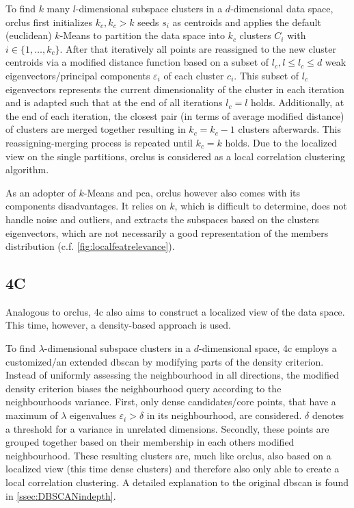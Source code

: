 To find $k$ many $l$-dimensional subspace clusters in a $d$-dimensional data space, \gls{orclus} first initializes $k_c, k_c > k$ seeds $s_i$ as centroids and applies the default (euclidean) $k$-Means to partition the data space into $k_c$ clusters $C_i$ with $i \in \{1,\dotsc,k_c\}$. After that iteratively all points are reassigned to the new cluster centroids via a modified distance function based on a subset of $l_c, l\leq l_c \leq d$ weak eigenvectors/principal components $\varepsilon_i$ of each cluster $c_i$. This subset of $l_c$ eigenvectors represents the current dimensionality of the cluster in each iteration and is adapted such that at the end of all iterations $l_c=l$ holds. Additionally, at the end of each iteration, the closest pair (in terms of average modified distance) of clusters are merged together resulting in $k_c = k_c-1$ clusters afterwards. This reassigning-merging process is repeated until $k_c = k$ holds. Due to the localized view on the single partitions, \gls{orclus} is considered as a local correlation clustering algorithm\cite{orclusaggarwal2000finding}.

As an adopter of $k$-Means and \gls{pca}, \gls{orclus} however also comes with its components disadvantages. It relies on $k$, which is difficult to determine, does not handle noise and outliers, and extracts the subspaces based on the clusters eigenvectors, which are not necessarily a good representation of the members distribution (c.f. \autoref{fig:localfeatrelevance}).


\subsection{4C}\label{ssec:4c}
Analogous to \gls{orclus}, \gls{4c} also aims to construct a localized view of the data space. This time, however, a density-based approach is used. 

To find $\lambda$-dimensional subspace clusters in a $d$-dimensional space, \gls{4c} employs a customized/an extended \acrshort{dbscan} by modifying parts of the density criterion. 
Instead of uniformly assessing the neighbourhood in all directions, the modified density criterion biases the neighbourhood query according to the neighbourhoods variance. First, only dense candidates/core points, that have a maximum of $\lambda$ eigenvalues $\varepsilon_i > \delta$ in its neighbourhood, are considered. $\delta$ denotes a threshold for a variance in unrelated dimensions. Secondly, these points are grouped together based on their membership in each others modified neighbourhood. These resulting clusters are, much like \gls{orclus}, also based on a localized view (this time dense clusters) and therefore also only able to create a local correlation clustering\cite{4cbohm2004computing}. A detailed explanation to the original \acrshort{dbscan} is found in \autoref{ssec:DBSCANindepth}.

